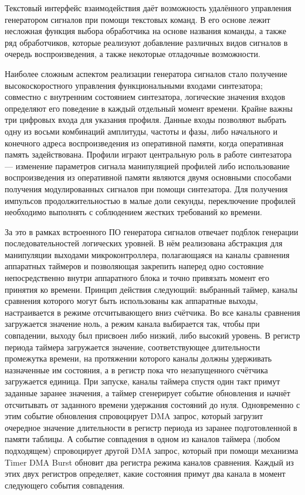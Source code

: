 \documentclass{report}
\begin{document}
Текстовый интерфейс взаимодействия даёт возможность удалённого управления генератором сигналов при помощи текстовых команд. В его основе лежит несложная функция выбора обработчика на основе названия команды, а также ряд обработчиков, которые реализуют добавление различных видов сигналов в очередь воспроизведения, а также некоторые отладочные возможности.

Наиболее сложным аспектом реализации генератора сигналов стало получение высокоскоростного управления функциональными входами синтезатора; совместно с внутренним состоянием синтезатора, логические значения входов определяют его поведение в каждый отдельный момент времени. Крайне важны три цифровых входа для указания профиля. Данные входы позволяют выбрать одну из восьми комбинаций амплитуды, частоты и фазы, либо начального и конечного адреса воспроизведения из оперативной памяти, когда оперативная память задействована. Профили играют центральную роль в работе синтезатора --- изменение параметров сигнала манипуляцией профилей либо использование воспроизведения из оперативной памяти являются двумя основными способами получения модулированных сигналов при помощи синтезатора. Для получения импульсов продолжительностью в малые доли секунды, переключение профилей необходимо выполнять с соблюдением жестких требований ко времени.

За это в рамках встроенного ПО генератора сигналов отвечает подблок генерации последовательностей логических уровней. В нём реализована абстракция для манипуляции выходами микроконтроллера, полагающаяся на каналы сравнения аппаратных таймеров и позволяющая закрепить наперед одно состояние непосредственно внутри аппаратного блока и точно привязать момент его принятия ко времени. Принцип действия следующий: выбранный таймер, каналы сравнения которого могут быть использованы как аппаратные выходы, настраивается в режиме отсчитывающего вниз счётчика. Во все каналы сравнения загружается значение ноль, а режим канала выбирается так, чтобы при совпадении, выходу был присвоен либо низкий, либо высокий уровень. В регистр периода таймера загружается значение, соответствующее длительности промежутка времени, на протяжении которого каналы должны удерживать назначенные им состояния, а в регистр пока что незапущенного счётчика загружается единица. При запуске, каналы таймера спустя один такт примут заданные заранее значения, а таймер сгенерирует событие обновления и начнёт отсчитывать от заданного времени удержания состояний до нуля. Одновременно с этим событие обновления спровоцирует DMA запрос, который загрузит очередное значение длительности в регистр периода из заранее подготовленной в памяти таблицы. А событие совпадения в одном из каналов таймера (любом подходящем) спровоцирует другой DMA запрос, который при помощи механизма Timer DMA Burst обновит два регистра режима каналов сравнения. Каждый из этих двух регистров определяет, какие состояния примут два канала в момент следующего события совпадения.
\end{document}
